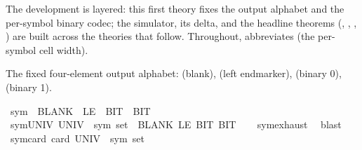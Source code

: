 \begin{isabellebody}
\begin{isamarkuptext}
  The development is layered: this first theory fixes the output
  alphabet  and the per-symbol binary codec; the
  simulator, its delta, and the headline theorems
  (, ,
  , ) are
  built across the theories that follow.
  Throughout,  abbreviates  (the per-symbol cell width).%
\end{isamarkuptext}\isamarkuptrue%
%
\begin{isamarkuptext}%
The fixed four-element output alphabet:
   (blank),  (left endmarker),
   (binary 0),  (binary 1).%
\end{isamarkuptext}\isamarkuptrue%
\isamarkupfalse%
\ sym{}\ {\isacharequal}{\kern0pt}\ BLANK{}\ {\isacharbar}{\kern0pt}\ LE{}\ {\isacharbar}{\kern0pt}\ BIT{}\ {\isacharbar}{\kern0pt}\ BIT{}\isanewline
\isanewline
{}\isamarkupfalse%
\ sym{}{\isacharunderscore}{\kern0pt}UNIV{\isacharcolon}{\kern0pt}\ {\isachardoublequoteopen}{\isacharparenleft}{\kern0pt}UNIV\ {\isacharcolon}{\kern0pt}{\isacharcolon}{\kern0pt}\ sym{}\ set{\isacharparenright}{\kern0pt}\ {\isacharequal}{\kern0pt}\ {\isacharbraceleft}{\kern0pt}BLANK{}{\isacharcomma}{\kern0pt}\ LE{}{\isacharcomma}{\kern0pt}\ BIT{}{\isacharcomma}{\kern0pt}\ BIT{}{\isacharbraceright}{\kern0pt}{\isachardoublequoteclose}\isanewline
%
\isadelimproof
\ \ %
\endisadelimproof
%
\isatagproof
{}\isamarkupfalse%
\ sym{}{\isachardot}{\kern0pt}exhaust\ \isamarkupfalse%
\ blast%
\endisatagproof
{\isafoldproof}%
%
\isadelimproof
\isanewline
%
\endisadelimproof
\isanewline
{}\isamarkupfalse%
\ sym{}{\isacharunderscore}{\kern0pt}card{\isacharcolon}{\kern0pt}\ {\isachardoublequoteopen}card\ {\isacharparenleft}{\kern0pt}UNIV\ {\isacharcolon}{\kern0pt}{\isacharcolon}{\kern0pt}\ sym{}\ set{\isacharparenright}{\kern0pt}\ {\isacharequal}{\kern0pt}\ {}{\isachardoublequoteclose}\isanewline
%
\isadelimproof

\end{isabellebody}

